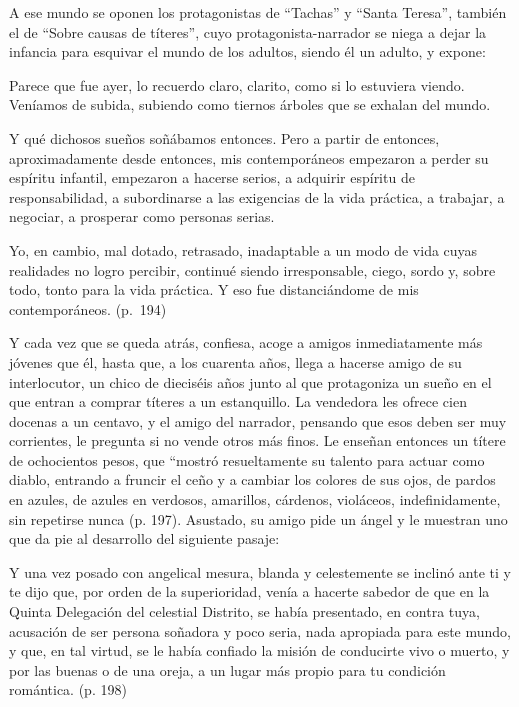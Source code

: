 \documentclass[14pt,twoside,final]{extbook} %
\begin{document}
A ese mundo se oponen los protagonistas de ``Tachas'' y ``Santa Teresa'', también el de ``Sobre causas de títeres'', cuyo protagonista-narrador se niega a dejar la infancia para esquivar el mundo de los adultos, siendo él un adulto, y expone:
\begin{quoting}
Parece que fue ayer, lo recuerdo claro, clarito, como si lo estuviera viendo. Veníamos de subida, subiendo como tiernos árboles que se exhalan del mundo.

Y qué dichosos sueños soñábamos entonces. Pero a partir de entonces, aproximadamente desde entonces, mis contemporáneos empezaron a perder su espíritu infantil, empezaron a hacerse serios, a adquirir espíritu de responsabilidad, a subordinarse a las exigencias de la vida práctica, a trabajar, a negociar, a prosperar como personas serias.

Yo, en cambio, mal dotado, retrasado, inadaptable a un modo de vida cuyas realidades no logro percibir, continué siendo irresponsable, ciego, sordo y, sobre todo, tonto para la vida práctica. Y eso fue distanciándome de mis contemporáneos. (p.~194)
\end{quoting}
Y cada vez que se queda atrás, confiesa, acoge a amigos inmediatamente más jóvenes que él, hasta que, a los cuarenta años, llega a hacerse amigo de su interlocutor, un chico de dieciséis años junto al que protagoniza un sueño en el que entran a comprar títeres a un estanquillo. La vendedora les ofrece cien docenas a un centavo, y el amigo del narrador, pensando que esos deben ser muy corrientes, le pregunta si no vende otros más finos. Le enseñan entonces un títere de ochocientos pesos, que ``mostró resueltamente su talento para actuar como diablo, entrando a fruncir el ceño y a cambiar los colores de sus ojos, de pardos en azules, de azules en verdosos, amarillos, cárdenos, violáceos, indefinidamente, sin repetirse nunca (p. 197). Asustado, su amigo pide un ángel y le muestran uno que da pie al desarrollo del siguiente pasaje:
\begin{quoting}
Y una vez posado con angelical mesura, blanda y celestemente se inclinó ante ti y te dijo que, por orden de la superioridad, venía a hacerte sabedor de que en la Quinta Delegación del celestial Distrito, se había presentado, en contra tuya, acusación de ser persona soñadora y poco seria, nada apropiada para este mundo, y que, en tal virtud, se le había confiado la misión de conducirte vivo o muerto, y por las buenas o de una oreja, a un lugar más propio para tu condición romántica. (p. 198)
\end{quoting}
\end{document}
